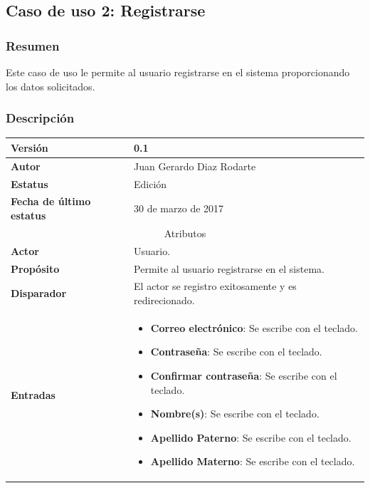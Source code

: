 \subsection{Caso de uso 2: Registrarse} \label{cu2}
\subsubsection{Resumen}
Este caso de uso le permite al usuario registrarse en el sistema proporcionando los datos solicitados.
\subsubsection{Descripción}
\begingroup
\setlength{\LTleft}{-10cm plus -1fill}
\setlength{\LTright}{\LTleft}
\begin{center}
  \addtocounter{table}{-1}
   \label{tab:cu2_tab}
  \begin{longtable}{| p{3.5cm} | p{11.5cm} |}
      	\hline
      		\textbf{Versión} &  0.1 \\
        \hline 
       		\textbf{Autor} & Juan Gerardo Diaz Rodarte\\
        \hline
          \textbf{Estatus} & Edición \\
        \hline  
          \textbf{Fecha de último estatus} & 30 de marzo de 2017 \\
        \hline
      \multicolumn{2}{|c|}{\large{Atributos}} \\
        \hline
          \textbf{Actor} & Usuario. \\
        \hline	
          \textbf{Propósito} & Permite al usuario registrarse en el sistema. \\
        \hline
          \textbf{Disparador} & El actor se registro exitosamente y es redirecionado. \\
        \hline
          \textbf{Entradas} & 
            \begin{itemize}
              \item \textbf{Correo electrónico}: Se escribe con el teclado.
              \item \textbf{Contraseña}: Se escribe con el teclado.
              \item \textbf{Confirmar contraseña}: Se escribe con el teclado.
              \item \textbf{Nombre(s)}: Se escribe con el teclado.
              \item \textbf{Apellido Paterno}: Se escribe con el teclado.
              \item \textbf{Apellido Materno}: Se escribe con el teclado.

\end{itemize}
\end{longtable}
\end{center}
